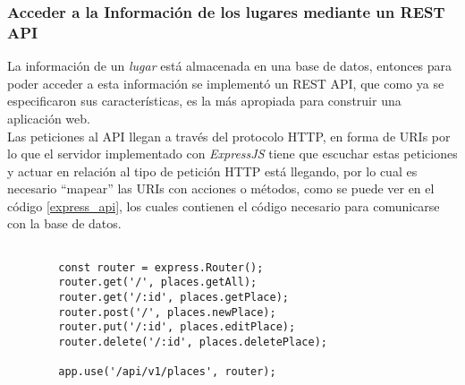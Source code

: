 %
%
%
%



\subsubsection{Acceder a la Información de los lugares mediante un REST API }


La información de un \emph{lugar} está almacenada en una base de datos, entonces para poder acceder a esta información se implementó un REST API, que como ya se especificaron sus características, es la más apropiada para construir una aplicación web. \\

Las peticiones al API llegan a través del protocolo HTTP, en forma de URIs por lo que el servidor implementado con \emph{ExpressJS} tiene que escuchar estas peticiones y actuar en relación al tipo de petición HTTP está llegando, por lo cual es necesario ``mapear'' las URIs con acciones o métodos, como se puede ver en el código \ref{express_api}, los cuales contienen el código necesario para comunicarse con la base de datos. \\


\begin{center}
  \begin{lstlisting}[label=express_api,caption=Declarando API REST con ExpressJS]

        const router = express.Router();
        router.get('/', places.getAll);
        router.get('/:id', places.getPlace);
        router.post('/', places.newPlace);
        router.put('/:id', places.editPlace);
        router.delete('/:id', places.deletePlace);

        app.use('/api/v1/places', router);

  \end{lstlisting}
\end{center}



